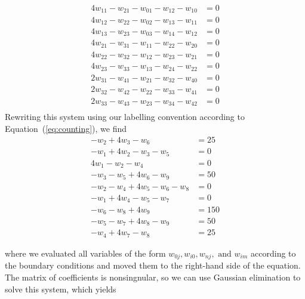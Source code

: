 \documentclass[12pt, titlepage]{article}
\begin{document}
    {\singlespacing
        \begin{align*}
            4w_{11} - w_{21} - w_{01} - w_{12} - w_{10} &= 0\\
            4w_{12} - w_{22} - w_{02} - w_{13} - w_{11} &= 0\\
            4w_{13} - w_{23} - w_{03} - w_{14} - w_{12} &= 0\\
            4w_{21} - w_{31} - w_{11} - w_{22} - w_{20} &= 0\\
            4w_{22} - w_{32} - w_{12} - w_{23} - w_{21} &= 0\\
            4w_{23} - w_{33} - w_{13} - w_{24} - w_{22} &= 0\\
            2w_{31} - w_{41} - w_{21} - w_{32} - w_{40} &= 0\\
            2w_{32} - w_{42} - w_{22} - w_{33} - w_{41} &= 0\\
            2w_{33} - w_{43} - w_{23} - w_{34} - w_{42} &= 0\\
        \end{align*}
    }
    Rewriting this system using our labelling convention according to Equation~(\ref{eq:counting}), we find
    {\singlespacing
        \begin{equation}\label{eq:heat_distr}
            \begin{split}
                -w_2 + 4w_3 -w_6 &= 25\\
                -w_1 + 4w_2 - w_3 - w_5 &= 0\\
                4w_1 - w_2 - w_4 &= 0\\
                -w_3-w_5+4w_6-w_9 &= 50\\
                -w_2 - w_4 + 4w_5 - w_6 - w_8 &= 0\\
                -w_1 + 4w_4 -w_5 -w_7 &= 0\\
                -w_6 - w_8 + 4w_9 &= 150\\
                -w_5 - w_7 + 4w_8 -w_9 &= 50\\
                -w_4 + 4w_7 - w_8 &= 25
            \end{split}
        \end{equation}
    }

    where we evaluated all variables of the form $w_{0j}, w_{i0}, w_{nj}, \text{ and } w_{im}$ according to the boundary conditions and
    moved them to the right-hand side of the equation. The matrix of coefficients is nonsingnular, so we can use Gaussian elimination to solve this system, which yields
    
\end{document}
